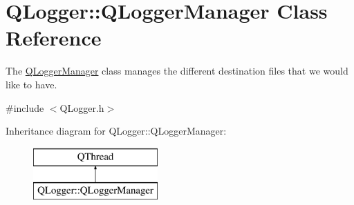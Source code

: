 \hypertarget{class_q_logger_1_1_q_logger_manager}{}\section{Q\+Logger\+::Q\+Logger\+Manager Class Reference}
\label{class_q_logger_1_1_q_logger_manager}


The \mbox{\hyperlink{class_q_logger_1_1_q_logger_manager}{Q\+Logger\+Manager}} class manages the different destination files that we would like to have.  




{\ttfamily \#include $<$Q\+Logger.\+h$>$}

Inheritance diagram for Q\+Logger\+::Q\+Logger\+Manager\+:\begin{figure}[H]
\begin{center}
\leavevmode
\includegraphics[height=2.000000cm]{class_q_logger_1_1_q_logger_manager}
\end{center}
\end{figure}
